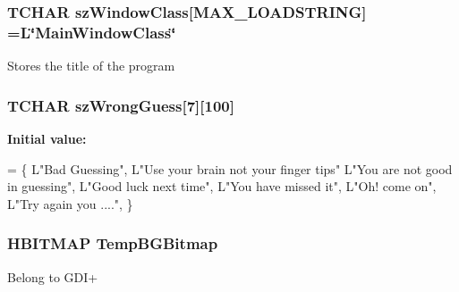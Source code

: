 \subsubsection[{sz\+Window\+Class}]{\setlength{\rightskip}{0pt plus 5cm}T\+C\+H\+A\+R sz\+Window\+Class\mbox{[}{\bf M\+A\+X\+\_\+\+L\+O\+A\+D\+S\+T\+R\+I\+N\+G}\mbox{]} =L\char`\"{}Main\+Window\+Class\char`\"{}}\label{_b_o_w-a_01film_01guessing_01game_8cpp_ac428b0bb455914397f2929cc9a3eb9e4}
Stores the title of the program \hypertarget{_b_o_w-a_01film_01guessing_01game_8cpp_a8837e0ecc39b8b0f1aa81db475440cfc}{}
\subsubsection[{sz\+Wrong\+Guess}]{\setlength{\rightskip}{0pt plus 5cm}T\+C\+H\+A\+R sz\+Wrong\+Guess\mbox{[}7\mbox{]}\mbox{[}100\mbox{]}}\label{_b_o_w-a_01film_01guessing_01game_8cpp_a8837e0ecc39b8b0f1aa81db475440cfc}
{\bfseries Initial value\+:}
\begin{DoxyCode}
= \{ L\textcolor{stringliteral}{"Bad Guessing"},
L\textcolor{stringliteral}{"Use your brain not your finger tips"}
L\textcolor{stringliteral}{"You are not good in guessing"},
L\textcolor{stringliteral}{"Good luck next time"},
L\textcolor{stringliteral}{"You have missed it"},
L\textcolor{stringliteral}{"Oh! come on"},
L\textcolor{stringliteral}{"Try again you ...."},
\}
\end{DoxyCode}
\hypertarget{_b_o_w-a_01film_01guessing_01game_8cpp_a4df24c9cd183e9df90e2fc5a09e54aa6}{}
\subsubsection[{Temp\+B\+G\+Bitmap}]{\setlength{\rightskip}{0pt plus 5cm}H\+B\+I\+T\+M\+A\+P Temp\+B\+G\+Bitmap}\label{_b_o_w-a_01film_01guessing_01game_8cpp_a4df24c9cd183e9df90e2fc5a09e54aa6}
Belong to G\+D\+I+ \hypertarget{_b_o_w-a_01film_01guessing_01game_8cpp_a4be9a5a1cac801777358d2c0e3f90830}{}
